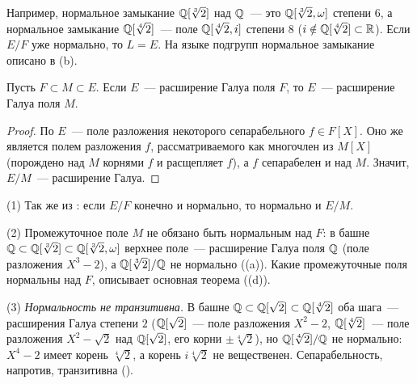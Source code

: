Например, нормальное замыкание $\mathbb Q[\sqrt[3]2]$ над $\mathbb Q$~--- это $\mathbb Q[\sqrt[3]2,\omega]$ степени $6$, а нормальное замыкание
$\mathbb Q[\sqrt[4]2]$~--- поле $\mathbb Q[\sqrt[4]2,i]$ степени $8$ ($i\notin\mathbb Q[\sqrt[4]2]\subset\mathbb R$). Если $E/F$ уже нормально, то $L=E$.
На языке подгрупп нормальное замыкание описано в (b).

\begin{corollary}[3.13]
Пусть $F\subset M\subset E$. Если $E$~--- расширение Галуа поля $F$, то $E$~--- расширение Галуа поля $M$.
\end{corollary}

\begin{proof}
По  $E$~--- поле разложения некоторого сепарабельного $f\in F[X]$. Оно же является полем разложения $f$,
рассматриваемого как многочлен из $M[X]$ (порождено над $M$ корнями $f$ и расщепляет $f$), а $f$ сепарабелен и над $M$.
Значит, $E/M$~--- расширение Галуа.
\end{proof}

\begin{example}[3.13a]
(1) Так же из : если $E/F$ конечно и нормально, то нормально и $E/M$.

(2) Промежуточное поле $M$ не обязано быть нормальным над $F$: в башне $\mathbb Q\subset\mathbb Q[\sqrt[3]2]\subset\mathbb Q[\sqrt[3]2,\omega]$
верхнее поле~--- расширение Галуа поля $\mathbb Q$ (поле разложения $X^3-2$), а $\mathbb Q[\sqrt[3]2]/\mathbb Q$ не нормально ((a)).
Какие промежуточные поля нормальны над $F$, описывает основная теорема ((d)).

(3) \emph{Нормальность не транзитивна.} В башне $\mathbb Q\subset\mathbb Q[\sqrt2]\subset\mathbb Q[\sqrt[4]2]$ оба шага~--- расширения
Галуа степени $2$ ($\mathbb Q[\sqrt2]$~--- поле разложения $X^2-2$, $\mathbb Q[\sqrt[4]2]$~--- поле разложения $X^2-\sqrt2$ над
$\mathbb Q[\sqrt2]$, его корни $\pm\sqrt[4]2$), но $\mathbb Q[\sqrt[4]2]/\mathbb Q$ не нормально: $X^4-2$ имеет корень $\sqrt[4]2$, а корень
$i\sqrt[4]2$ не вещественен. Сепарабельность, напротив, транзитивна ().
\end{example}

\begin{keepfig}
\begin{center}
\end{center}
\end{keepfig}

